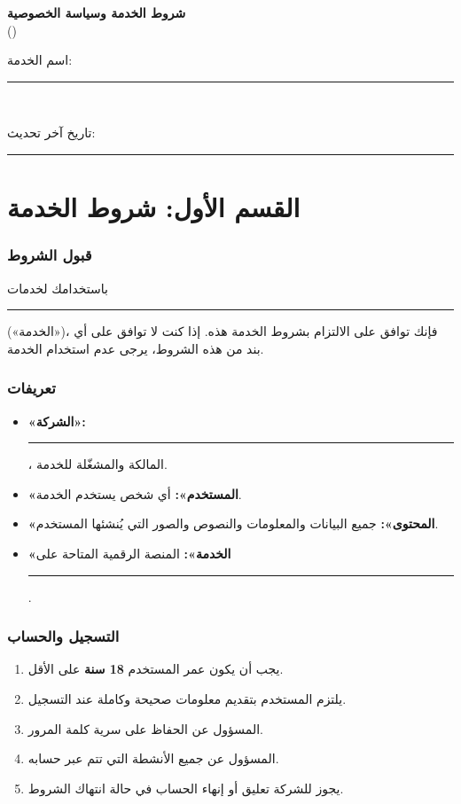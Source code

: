 \documentclass[11pt,a4paper]{article}
\begin{document}
\begin{center}
{\LARGE\bfseries شروط الخدمة وسياسة الخصوصية}\\[0.5em]
{\large ()}\\[1em]
{\normalsize اسم الخدمة: \rule{6cm}{0.4pt}}\\[0.3em]
{\normalsize تاريخ آخر تحديث: \rule{4cm}{0.4pt}}
\end{center}

\vspace{1.5em}

\part*{القسم الأول: شروط الخدمة}

\section{قبول الشروط}
\label{sec:acceptance}
باستخدامك لخدمات \rule{6cm}{0.4pt} («الخدمة»)، فإنك توافق على الالتزام بشروط الخدمة هذه. إذا كنت لا توافق على أي بند من هذه الشروط، يرجى عدم استخدام الخدمة.

\section{تعريفات}
\label{sec:definitions}
\begin{itemize}
    \item \textbf{«الشركة»:} \rule{6cm}{0.4pt}، المالكة والمشغّلة للخدمة.
    \item \textbf{«المستخدم»:} أي شخص يستخدم الخدمة.
    \item \textbf{«المحتوى»:} جميع البيانات والمعلومات والنصوص والصور التي يُنشئها المستخدم.
    \item \textbf{«الخدمة»:} المنصة الرقمية المتاحة على \rule{4cm}{0.4pt}.
\end{itemize}

\section{التسجيل والحساب}
\label{sec:registration}
\begin{enumerate}
    \item يجب أن يكون عمر المستخدم \textbf{18 سنة} على الأقل.
    \item يلتزم المستخدم بتقديم معلومات صحيحة وكاملة عند التسجيل.
    \item المسؤول عن الحفاظ على سرية كلمة المرور.
    \item المسؤول عن جميع الأنشطة التي تتم عبر حسابه.
    \item يجوز للشركة تعليق أو إنهاء الحساب في حالة انتهاك الشروط.
\end{enumerate}
\end{document}

